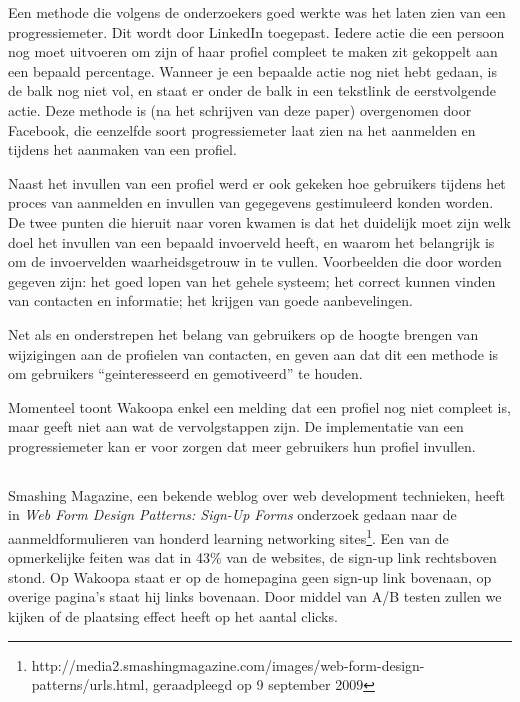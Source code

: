 \documentclass[a4paper, 10pt, pdftex]{report}
\begin{document}
    Een methode die volgens de onderzoekers goed werkte was het laten zien van een progressiemeter. Dit wordt door LinkedIn toegepast. Iedere actie die een persoon nog moet uitvoeren om zijn of haar profiel compleet te maken zit gekoppelt aan een bepaald percentage. Wanneer je een bepaalde actie nog niet hebt gedaan, is de balk nog niet vol, en staat er onder de balk in een tekstlink de eerstvolgende actie. Deze methode is (na het schrijven van deze paper) overgenomen door Facebook, die eenzelfde soort progressiemeter laat zien na het aanmelden en tijdens het aanmaken van een profiel.

    Naast het invullen van een profiel werd er ook gekeken hoe gebruikers tijdens het proces van aanmelden en invullen van gegegevens gestimuleerd konden worden. De twee punten die hieruit naar voren kwamen is dat het duidelijk moet zijn welk doel het invullen van een bepaald invoerveld heeft, en waarom het belangrijk is om de invoervelden waarheidsgetrouw in te vullen. Voorbeelden die door \citeauthor{Brouns2008} worden gegeven zijn: het goed lopen van het gehele systeem; het correct kunnen vinden van contacten en informatie; het krijgen van goede aanbevelingen.

    Net als \citet{Berlanga2007} en \citet{Sohn2005} onderstrepen \citeauthor{Brouns2008} het belang van gebruikers op de hoogte brengen van wijzigingen aan de profielen van contacten, en geven aan dat dit een methode is om gebruikers ``geinteresseerd en gemotiveerd'' te houden.

Momenteel toont Wakoopa enkel een melding dat een profiel nog niet compleet is, maar geeft niet aan wat de vervolgstappen zijn. De implementatie van een progressiemeter kan er voor zorgen dat meer gebruikers hun profiel invullen.

    \subsection{\cite{Editorial2008}}

    Smashing Magazine, een bekende weblog over web development technieken, heeft in \emph{Web Form Design Patterns: Sign-Up Forms} onderzoek gedaan naar de aanmeldformulieren van honderd learning networking sites\footnote{http://media2.smashingmagazine.com/images/web-form-design-patterns/urls.html, geraadpleegd op 9 september 2009}. Een van de opmerkelijke feiten was dat in 43\% van de websites, de sign-up link rechtsboven stond. Op Wakoopa staat er op de homepagina geen sign-up link bovenaan, op overige pagina's staat hij links bovenaan. Door middel van A/B testen zullen we kijken of de plaatsing effect heeft op het aantal clicks.
\end{document}
